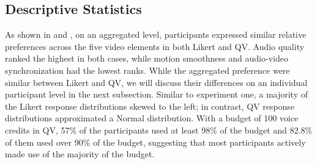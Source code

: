 \subsection{Descriptive Statistics}

As shown in  and , on an aggregated level, participants expressed similar relative preferences across the five video elements in both Likert and QV. Audio quality ranked the highest in both cases, while motion smoothness and audio-video synchronization had the lowest ranks. While the aggregated preference were similar between Likert and QV, we will discuss their differences on an individual participant level in the next subsection. Similar to experiment one, a majority of the Likert response distributions skewed to the left; in contrast, QV response distributions approximated a Normal distribution. With a budget of 100 voice credits in QV, 57\% of the participants used at least 98\% of the budget and 82.8\% of them used over 90\% of the budget, suggesting that most participants actively made use of the majority of the budget.

